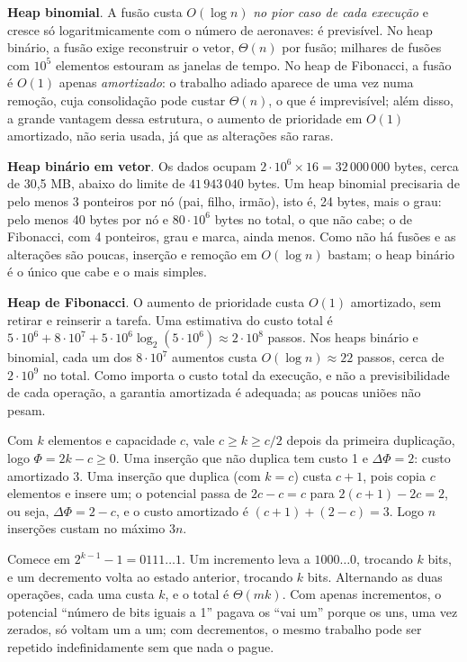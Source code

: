  \textbf{Heap binomial}. A fusão custa $O(\log n)$ \emph{no pior caso de cada execução} e cresce só logaritmicamente com o número de aeronaves: é previsível. No heap binário, a fusão exige reconstruir o vetor, $\Theta(n)$ por fusão; milhares de fusões com $10^5$ elementos estouram as janelas de tempo. No heap de Fibonacci, a fusão é $O(1)$ apenas \emph{amortizado}: o trabalho adiado aparece de uma vez numa remoção, cuja consolidação pode custar $\Theta(n)$, o que é imprevisível; além disso, a grande vantagem dessa estrutura, o aumento de prioridade em $O(1)$ amortizado, não seria usada, já que as alterações são raras.

 \textbf{Heap binário em vetor}. Os dados ocupam $2\cdot10^6\times16=32\,000\,000$ bytes, cerca de 30,5 MB, abaixo do limite de $41\,943\,040$ bytes. Um heap binomial precisaria de pelo menos 3 ponteiros por nó (pai, filho, irmão), isto é, 24 bytes, mais o grau: pelo menos 40 bytes por nó e $80\cdot10^6$ bytes no total, o que não cabe; o de Fibonacci, com 4 ponteiros, grau e marca, ainda menos. Como não há fusões e as alterações são poucas, inserção e remoção em $O(\log n)$ bastam; o heap binário é o único que cabe e o mais simples.

 \textbf{Heap de Fibonacci}. O aumento de prioridade custa $O(1)$ amortizado, sem retirar e reinserir a tarefa. Uma estimativa do custo total é $5\cdot10^6+8\cdot10^7+5\cdot10^6\log_2(5\cdot10^6)\approx2\cdot10^8$ passos. Nos heaps binário e binomial, cada um dos $8\cdot10^7$ aumentos custa $O(\log n)\approx22$ passos, cerca de $2\cdot10^9$ no total. Como importa o custo total da execução, e não a previsibilidade de cada operação, a garantia amortizada é adequada; as poucas uniões não pesam.

 Com $k$ elementos e capacidade $c$, vale $c\ge k\ge c/2$ depois da primeira duplicação, logo $\Phi=2k-c\ge0$. Uma inserção que não duplica tem custo 1 e $\Delta\Phi=2$: custo amortizado 3. Uma inserção que duplica (com $k=c$) custa $c+1$, pois copia $c$ elementos e insere um; o potencial passa de $2c-c=c$ para $2(c+1)-2c=2$, ou seja, $\Delta\Phi=2-c$, e o custo amortizado é $(c+1)+(2-c)=3$. Logo $n$ inserções custam no máximo $3n$.

 Comece em $2^{k-1}-1=0111\ldots1$. Um incremento leva a $1000\ldots0$, trocando $k$ bits, e um decremento volta ao estado anterior, trocando $k$ bits. Alternando as duas operações, cada uma custa $k$, e o total é $\Theta(mk)$. Com apenas incrementos, o potencial ``número de bits iguais a 1'' pagava os ``vai um'' porque os uns, uma vez zerados, só voltam um a um; com decrementos, o mesmo trabalho pode ser repetido indefinidamente sem que nada o pague.

